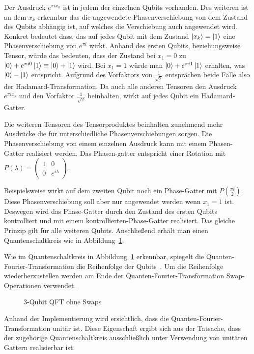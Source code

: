 Der Ausdruck \(e^{\pi i x_k}\) ist in jedem der einzelnen Qubits vorhanden.
Des weiteren ist an dem \(x_k\) erkennbar das die angewendete Phasenverschiebung von dem Zustand des Qubits abhängig ist,
auf welches die Verschiebung auch angewendet wird.
Konkret bedeutet dass, das auf jedes Qubit mit dem Zustand \(\ket{x_k} = \ket{1}\) eine Phasenverschiebung von \(e^{\pi i}\) wirkt.
Anhand des ersten Qubits, beziehungsweise Tensor, würde das bedeuten, dass der Zustand bei \(x_1 = 0\)
zu \(\ket{0} + e^{\pi i 0} \ket{1} \equiv \ket{0} + \ket{1}\) wird.
Bei \(x_1 = 1\) würde man \(\ket{0} + e^{\pi i 1} \ket{1}\) erhalten,
was \(\ket{0} - \ket{1}\) entspricht.
Aufgrund des Vorfaktors von \(\frac{1}{\sqrt{2}}\) entsprächen beide Fälle also der Hadamard-Transformation.
Da auch alle anderen Tensoren den Ausdruck \(e^{\pi i x_k}\) und den Vorfaktor \(\frac{1}{\sqrt{2}}\) beinhalten, wirkt auf jedes Qubit ein Hadamard-Gatter.

Die weiteren Tensoren des Tensorproduktes beinhalten zunehmend mehr Ausdrücke die für unterschiedliche Phasenverschiebungen sorgen.
Die Phasenverschiebung von einem einzelnen Ausdruck kann mit einem Phasen-Gatter realisiert werden.
Das Phasen-gatter entspricht einer Rotation mit \(P(\lambda) = 
\begin{pmatrix}
  1 & 0 \\
  0 & e^{i \lambda}
\end{pmatrix}\).

Beispielsweise wirkt auf dem zweiten Qubit noch ein Phase-Gatter mit \(P(\frac{\pi i}{2} )\).
Diese Phasenverschiebung soll aber nur angewendet werden wenn \(x_1 = 1\) ist.
Deswegen wird das Phase-Gatter durch den Zustand des ersten Qubits kontrolliert und
mit einem kontrollierten-Phase-Gatter realisiert.
Das gleiche Prinzip gilt für alle weiteren Qubits.
Anschließend erhält man einen Quantenschaltkreis wie in Abbildung~\ref{fig:qft}.

Wie im Quantenschaltkreis in Abbildung~\ref{fig:qft} erkennbar, 
spiegelt die Quanten-Fourier-Transformation die Reihenfolge der Qubits~\cite{Hoever2023QC}.
Um die Reihenfolge wiederherzustellen werden am Ende der Quanten-Fourier-Transformation Swap-Operationen verwendet.
\begin{figure}
\caption{3-Qubit QFT ohne Swaps}
\label{fig:qft}
\centering
\end{figure}

Anhand der Implementierung wird ersichtlich,
dass die Quanten-Fourier-Transformation unitär ist. 
Diese Eigenschaft ergibt sich aus der Tatsache, 
dass der zugehörige Quantenschaltkreis ausschließlich unter Verwendung von unitären Gattern realisierbar ist.

